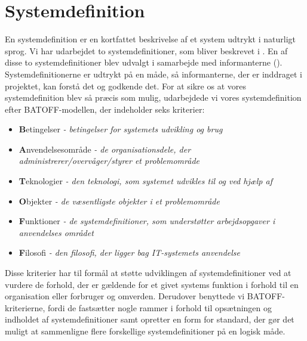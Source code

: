 \section{Systemdefinition}
\label{sec:systemdefinition}

En systemdefinition er en kortfattet beskrivelse af et system udtrykt i naturligt sprog. Vi har udarbejdet to systemdefinitioner, som bliver beskrevet i . En af disse to systemdefinitioner blev udvalgt i samarbejde med informanterne (). Systemdefinitionerne er udtrykt på en måde, så informanterne, der er inddraget i projektet, kan forstå det og godkende det. For at sikre os at vores systemdefinition blev så præcis som mulig, udarbejdede vi vores systemdefinition efter BATOFF-modellen, der indeholder seks kriterier\cite[s.~37]{ooad}:

\begin{itemize}[noitemsep]
\item \textbf{B}etingelser \textit{- betingelser for systemets udvikling og brug}
\item \textbf{A}nvendelsesområde \textit{- de organisationsdele, der administrerer/overvåger/styrer et problemområde}
\item \textbf{T}eknologier \textit{- den teknologi, som systemet udvikles til og ved hjælp af}
\item \textbf{O}bjekter \textit{- de væsentligste objekter i et problemområde}
\item \textbf{F}unktioner \textit{- de systemdefinitioner, som understøtter arbejdsopgaver i anvendelses området}
\item \textbf{F}ilosofi \textit{- den filosofi, der ligger bag IT-systemets anvendelse}
\end{itemize}

Disse kriterier har til formål at støtte udviklingen af systemdefinitioner ved at vurdere de forhold, der er gældende for et givet systems funktion i forhold til en organisation eller forbruger og omverden. Derudover benyttede vi BATOFF-kriterierne, fordi de fastsætter nogle rammer i forhold til opsætningen og indholdet af systemdefinitioner samt opretter en form for standard, der gør det muligt at sammenligne flere forskellige systemdefinitioner på en logisk måde.




